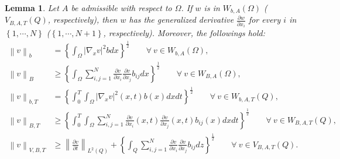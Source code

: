 \documentclass[11pt, a4paper]{article}
\newtheorem{lemma}[theorem]{Lemma}
\numberwithin{equation}{section}
\newcommand{\norm}[1]{\left\lVert #1\right\rVert}
\begin{document}
   \begin{lemma} Let $A$ be  admissible with respect to $\Omega$. If
     $w$ is in $W_{b,A}(\Omega)$  ($V_{B,A,T}(Q)$, respectively), then
     $w$ has the generalized derivative $\displaystyle \frac{\partial
       w}{\partial x_{i}}$ for every $i$ in
     $\left\{1,\cdots,N\right\}$ ($\left\{1,\cdots,N+1\right\}$,
     respectively). Moreover, the followings hold:
     \begin{align}
       \norm{v}_{b}
       &= \left\{\int_{\Omega}|\nabla_{x}v|^{2}bdx\right\}^{\frac{1}{2}}\qquad\forall~v\in W_{b,A}(\Omega),   
     \label{i3e}\\
     \norm{v}_{B}
     &\ge \left\{\int_{\Omega}\sum_{i,j=1}^{N}\frac{\partial v}{\partial x_{i}}\frac{\partial v}{\partial x_{j}}b_{ij}dx\right\}^{\frac{1}{2}} \qquad\forall~v\in W_{B,A}(\Omega),
     \label{i3eb}\\
     \norm{v}_{b,T}
     &= \left\{\int_{0}^{T}\int_{\Omega}|\nabla_{x}v|^{2}(x,t)b(x)dxdt\right\}^{\frac{1}{2}}\qquad\forall~v\in W_{b,A,T}(Q),   
   \label{i3}\\
   \norm{v}_{B,T}
   &\ge \left\{\int_{0}^{T}\int_{\Omega}\sum_{i,j=1}^{N}\frac{\partial v}{\partial x_{i}}(x,t)\frac{\partial v}{\partial x_{j}}(x,t)b_{ij}(x)dxdt\right\}^{\frac{1}{2}} \qquad\forall~v\in W_{B,A,T}(Q),
   \label{i3b}\\
   \norm{v}_{V,B,T}
   &\ge \norm{\frac{ \partial v}{\partial t}}_{L^{2}(Q)} +\left\{\int_{Q}\sum_{i,j=1}^{N}\frac{\partial v}{\partial x_{i}}\frac{\partial v}{\partial x_{j}}b_{ij}dz\right\}^{\frac{1}{2}} \qquad\forall~v\in V_{B,A,T}(Q).
\label{i3c}
\end{align}
\label{5z}
  \end{lemma}
\end{document}
